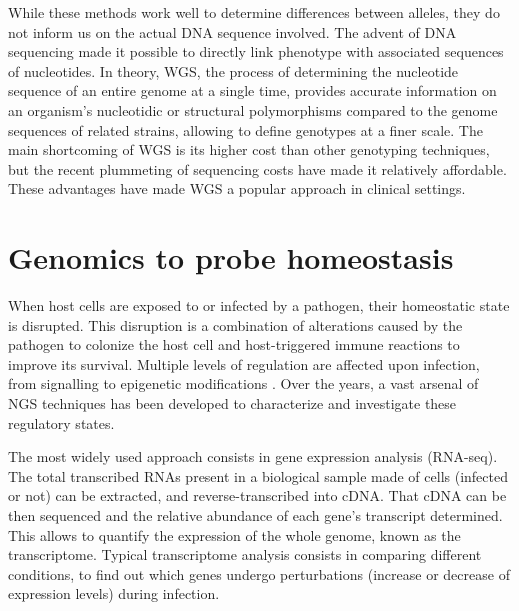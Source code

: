 While these methods work well to determine differences between alleles, they do not inform us on the actual DNA sequence involved. The advent of DNA sequencing made it possible to directly link phenotype with associated sequences of nucleotides. In theory, \acrfull{WGS}, the process of determining the nucleotide sequence of an entire genome at a single time, provides accurate information on an organism's nucleotidic or structural polymorphisms compared to the genome sequences of related strains, allowing to define genotypes at a finer scale. The main shortcoming of \acrshort{WGS} is its higher cost than other genotyping techniques, but the recent plummeting of sequencing costs have made it relatively affordable. These advantages have made \acrshort{WGS} a popular approach in clinical settings.

\section{Genomics to probe homeostasis}

When host cells are exposed to or infected by a pathogen, their homeostatic state is disrupted. This disruption is a combination of alterations caused by the pathogen to colonize the host cell and host-triggered immune reactions to improve its survival. Multiple levels of regulation are affected upon infection, from signalling to epigenetic modifications \cite{rolandoLegionellaPneumophilaType2014}. Over the years, a vast arsenal of NGS techniques has been developed to characterize and investigate these regulatory states. 

The most widely used approach consists in gene expression analysis (RNA-seq). The total transcribed RNAs present in a biological sample made of cells (infected or not) can be extracted, and reverse-transcribed into cDNA. That cDNA can be then sequenced and the relative abundance of each gene's transcript determined. This allows to quantify the expression of the whole genome, known as the transcriptome. Typical transcriptome analysis consists in comparing different conditions, to find out which genes undergo perturbations (increase or decrease of expression levels) during infection. 

